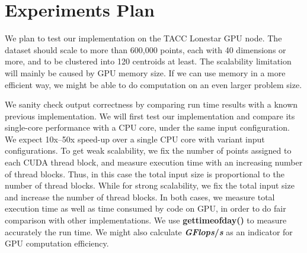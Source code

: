 \documentclass{article}
\begin{document}
\section{Experiments Plan}
We plan to test our implementation on the TACC Lonestar GPU node. 
The dataset should scale to more than 600,000 points, each with 
40 dimensions or more, and to be clustered into 120 centroids at least. 
The scalability limitation will mainly be caused by GPU memory size. If
we can use memory in a more efficient way, we might be able to do
computation on an even larger problem size. 

We sanity check output correctness by comparing run time results with a known 
previous implementation. 
We will first test our implementation and compare its single-core performance with 
a CPU core, under the same input configuration. We expect 10x--50x speed-up 
over a single CPU core with variant input configurations.
To get weak scalability, we fix the number of points assigned to
each CUDA thread block, and measure execution time with an increasing number 
of thread blocks. Thus, in this case the total input size is proportional to
the number of thread blocks.
While for strong scalability, we fix the total input size and increase the 
number of thread blocks. 
In both cases, we measure total execution time as well as time consumed by code
on GPU, in order to do fair comparison with other implementations.
We use \textbf{gettimeofday()} to measure accurately the run time.
We might also calculate \textbf{\textit{GFlops}/\textit{s}} as an indicator for GPU
computation efficiency.



\end{document}
